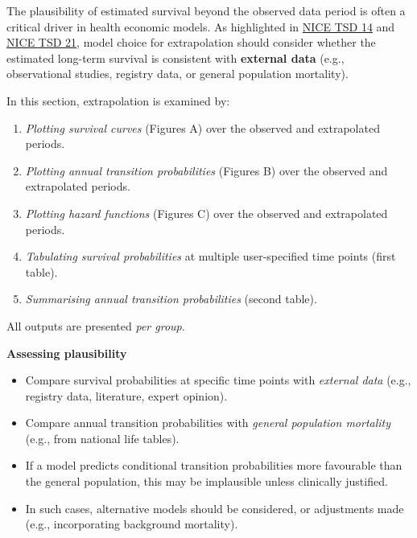 \documentclass[
]{article}
\providecommand{\tightlist}{%
  \setlength{\itemsep}{0pt}\setlength{\parskip}{0pt}}
\begin{document}
The plausibility of estimated survival beyond the observed data period
is often a critical driver in health economic models. As highlighted in
\href{https://nicedsu.org.uk/wp-content/uploads/2016/03/NICE-DSU-TSD-Survival-analysis.updated-March-2013.v2.pdf}{NICE
TSD 14} and \href{https://www.sheffield.ac.uk/media/34188/download}{NICE
TSD 21}, model choice for extrapolation should consider whether the
estimated long-term survival is consistent with \textbf{external data}
(e.g., observational studies, registry data, or general population
mortality).

In this section, extrapolation is examined by:

\begin{enumerate}
\def\labelenumi{\arabic{enumi}.}
\tightlist
\item
  \emph{Plotting survival curves} (Figures A) over the observed and
  extrapolated periods.\\
\item
  \emph{Plotting annual transition probabilities} (Figures B) over the
  observed and extrapolated periods.
\item
  \emph{Plotting hazard functions} (Figures C) over the observed and
  extrapolated periods.
\item
  \emph{Tabulating survival probabilities} at multiple user-specified
  time points (first table).
\item
  \emph{Summarising annual transition probabilities} (second table).
\end{enumerate}

All outputs are presented \emph{per group}.

\textbf{Assessing plausibility}

\begin{itemize}
\tightlist
\item
  Compare survival probabilities at specific time points with
  \emph{external data} (e.g., registry data, literature, expert
  opinion).\\
\item
  Compare annual transition probabilities with \emph{general population
  mortality} (e.g., from national life tables).\\
\item
  If a model predicts conditional transition probabilities more
  favourable than the general population, this may be implausible unless
  clinically justified.\\
\item
  In such cases, alternative models should be considered, or adjustments
  made (e.g., incorporating background mortality).
\end{itemize}
\end{document}
